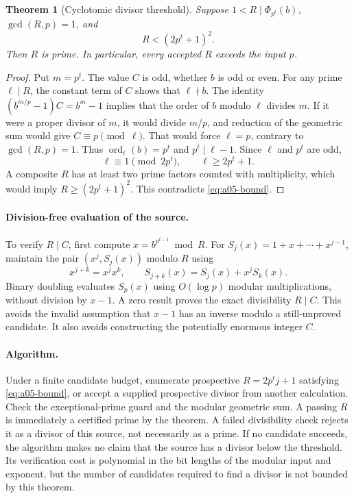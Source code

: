 \documentclass[11pt,a4paper]{article}
\newtheorem{theorem}{Theorem}[section]
\theoremstyle{definition}\newtheorem{definition}[theorem]{Definition}
\theoremstyle{remark}\newtheorem{remark}[theorem]{Remark}
\newcommand{\ord}{\operatorname{ord}}\newcommand{\rad}{\operatorname{rad}}
\begin{document}
\begin{theorem}[Cyclotomic divisor threshold]\label{thm:a05}
Suppose $1<R\mid\Phi_{p^t}(b)$, $\gcd(R,p)=1$, and
\begin{equation}\label{eq:a05-bound}
 R<(2p^t+1)^2.
\end{equation}
Then $R$ is prime. In particular, every accepted $R$ exceeds the input $p$.
\end{theorem}
\begin{proof}
Put $m=p^t$. The value $C$ is odd, whether $b$ is odd or even. For any
prime $\ell\mid R$, the constant term of $C$ shows that $\ell\nmid b$.
The identity $(b^{m/p}-1)C=b^m-1$ implies that the order of $b$ modulo
$\ell$ divides $m$. If it were a proper divisor of $m$, it would divide
$m/p$, and reduction of the geometric sum would give $C\equiv p\pmod\ell$.
That would force $\ell=p$, contrary to $\gcd(R,p)=1$. Thus
$\ord_\ell(b)=p^t$ and $p^t\mid\ell-1$. Since $\ell$ and $p^t$ are odd,
\[
 \ell\equiv1\pmod{2p^t},\qquad \ell\ge2p^t+1.
\]
A composite $R$ has at least two prime factors counted with multiplicity,
which would imply $R\ge(2p^t+1)^2$. This contradicts
\eqref{eq:a05-bound}.
\end{proof}

\paragraph{Division-free evaluation of the source.}
To verify $R\mid C$, first compute $x=b^{p^{t-1}}\bmod R$. For
$S_j(x)=1+x+\cdots+x^{j-1}$, maintain the pair
$(x^j,S_j(x))$ modulo $R$ using
\[
 x^{j+k}=x^j x^k,\qquad
 S_{j+k}(x)=S_j(x)+x^j S_k(x).
\]
Binary doubling evaluates $S_p(x)$ using $O(\log p)$ modular
multiplications, without division by $x-1$. A zero result proves the exact
divisibility $R\mid C$. This avoids the invalid assumption that $x-1$ has
an inverse modulo a still-unproved candidate. It also avoids constructing
the potentially enormous integer $C$.

\paragraph{Algorithm.}
Under a finite candidate budget, enumerate prospective
$R=2p^t j+1$ satisfying \eqref{eq:a05-bound}, or accept a supplied
prospective divisor from another calculation. Check the exceptional-prime
guard and the modular geometric sum. A passing $R$ is immediately a
certified prime by the theorem. A failed divisibility check rejects it as a
divisor of this source, not necessarily as a prime. If no candidate succeeds,
the algorithm makes no claim that the source has a divisor below the
threshold. Its verification cost is polynomial in the bit lengths of the
modular input and exponent, but the number of candidates required to find a
divisor is not bounded by this theorem.
\end{document}
